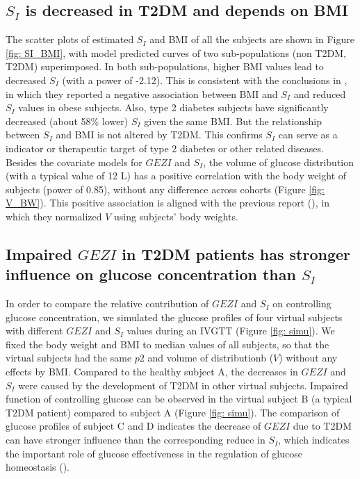 \documentclass[utf8]{frontiersSCNS} %
\begin{document}
\subsection{$S_I$ is decreased in T2DM and depends on BMI}
The scatter plots of estimated $S_I$ and BMI of all the subjects are shown in Figure \ref{fig: SI_BMI}, with model predicted curves of two sub-populations (non T2DM, T2DM) superimposed. In both sub-populations, higher BMI values lead to decreased $S_I$ (with a power of -2.12). This is consistent with the conclusions in %
, in which they reported a negative association between BMI and $S_I$ and reduced $S_I$ values in obese subjects. Also, type 2 diabetes subjects have significantly decreased (about 58\% lower) $S_I$ given the same BMI. But the relationship between $S_I$ and BMI is not altered by T2DM. This confirms $S_I$ can serve as a indicator or therapeutic target of type 2 diabetes or other related diseases. Besides the covariate models for $GEZI$ and $S_I$, the volume of glucose distribution (with a typical value of 12 L) has a positive correlation with the body weight of subjects (power of 0.85), without any difference across cohorts (Figure \ref{fig: V_BW}). This positive association is aligned with the previous report (\cite{Denti2010}), in which they normalized $V$ using subjects' body weights. 

\subsection{Impaired $GEZI$ in T2DM patients has stronger influence on glucose concentration than $S_I$}
In order to compare the relative contribution of $GEZI$ and $S_I$ on controlling glucose concentration, we simulated the glucose profiles of four virtual subjects with different $GEZI$ and $S_I$ values during an IVGTT (Figure \ref{fig: simu}). We fixed the body weight and BMI to median values of all subjects, so that the virtual subjects had the same $p2$ and volume of distributionb ($V$) without any effects by BMI. Compared to the healthy subject A, the decreases in $GEZI$ and $S_I$ were caused by the development of T2DM in other virtual subjects. Impaired function of controlling glucose can be observed in the virtual subject B (a typical T2DM patient) compared to subject A (Figure \ref{fig: simu}). The comparison of glucose profiles of subject C and D indicates the decrease of $GEZI$ due to T2DM can have stronger influence than the corresponding reduce in $S_I$, which indicates the important role of glucose effectiveness in the regulation of glucose homeostasis (\cite{Dube2015}). 
\end{document}
